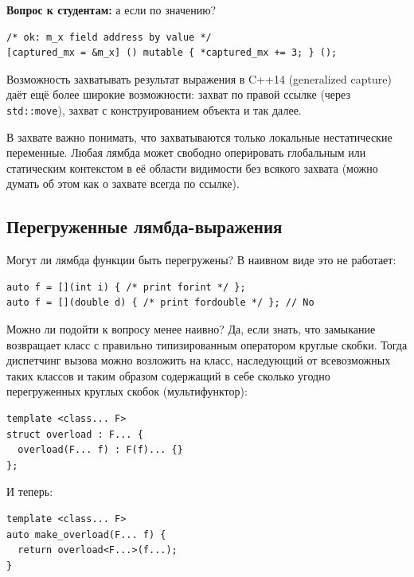 \documentclass[a4paper,12pt,oneside]{book}
\newif\ifanswers
\begin{document}
\ifanswers
Правильный ответ следует из простого размышления: что вообще синтаксически должна означать запись в такой адрес? Перемещение поля класса, хм?
\fi

\textbf{Вопрос к студентам:} а если по значению?

\begin{lstlisting}
/* ok: m_x field address by value */
[captured_mx = &m_x] () mutable { *captured_mx += 3; } ();
\end{lstlisting}

\ifanswers
Правильный ответ: да, по значению все хорошо
\fi

Возможность захватывать результат выражения в C++14 (generalized capture) даёт ещё более широкие возможности: захват по правой ссылке (через \lstinline!std::move!), захват с конструированием объекта и так далее.

В захвате важно понимать, что захватываются только локальные нестатические переменные. Любая лямбда может свободно оперировать глобальным или статическим контекстом в её области видимости без всякого захвата (можно думать об этом как о захвате всегда по ссылке).

\subsection{Перегруженные лямбда-выражения}\label{OverLambdas}

Могут ли лямбда функции быть перегружены? В наивном виде это не работает:

\begin{lstlisting}
auto f = [](int i) { /* print forint */ };
auto f = [](double d) { /* print fordouble */ }; // No
\end{lstlisting}

Можно ли подойти к вопросу менее наивно? Да, если знать, что замыкание возвращает класс с правильно типизированным оператором круглые скобки. Тогда диспетчинг вызова можно возложить на класс, наследующий от всевозможных таких классов и таким образом содержащий в себе сколько угодно перегруженных круглых скобок (мультифунктор):

\begin{lstlisting}
template <class... F>
struct overload : F... {
  overload(F... f) : F(f)... {} 
};
\end{lstlisting}

И теперь:
 
\begin{lstlisting}
template <class... F>
auto make_overload(F... f) {
  return overload<F...>(f...);  
}
\end{lstlisting}
\end{document}
